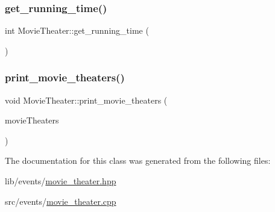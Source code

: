 \mbox{\label{class_movie_theater_a91a12e686c2d774181991b127467e414}} 
\subsubsection{\texorpdfstring{get\+\_\+running\+\_\+time()}{get\_running\_time()}}
{\footnotesize\ttfamily int Movie\+Theater\+::get\+\_\+running\+\_\+time (\begin{DoxyParamCaption}{ }\end{DoxyParamCaption})\hspace{0.3cm}{\ttfamily [inline]}}

\mbox{\label{class_movie_theater_a9a4320ced859c2bcd173e736aa940c83}} 
\subsubsection{\texorpdfstring{print\+\_\+movie\+\_\+theaters()}{print\_movie\_theaters()}}
{\footnotesize\ttfamily void Movie\+Theater\+::print\+\_\+movie\+\_\+theaters (\begin{DoxyParamCaption}\item[{std\+::map$<$ int, \hyperlink{class_movie_theater}{Movie\+Theater} $\ast$$>$}]{movie\+Theaters }\end{DoxyParamCaption})\hspace{0.3cm}{\ttfamily [static]}}



The documentation for this class was generated from the following files\+:\begin{DoxyCompactItemize}
\item 
lib/events/\hyperlink{movie__theater_8hpp}{movie\+\_\+theater.\+hpp}\item 
src/events/\hyperlink{movie__theater_8cpp}{movie\+\_\+theater.\+cpp}\end{DoxyCompactItemize}
